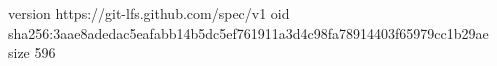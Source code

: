 version https://git-lfs.github.com/spec/v1
oid sha256:3aae8adedac5eafabb14b5dc5ef761911a3d4c98fa78914403f65979cc1b29ae
size 596
